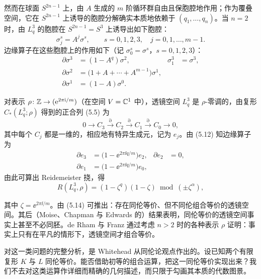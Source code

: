 然而在球面 $S^{2n-1}$ 上，由 $A$ 生成的 $m$ 阶循环群自由且保胞腔地作用；作为覆叠空间，它在 $S^{2n-1}$ 上诱导的胞腔分解确实本质地依赖于 $(q_1,\dots,q_n)$。当 $n=2$ 时，由 $L^3_q$ 的胞腔在 $S^{2n-1}=S^3$ 上诱导出如下胞腔：
\begin{equation}
  \sigma^s_j=A^j\sigma^s,\qquad s=0,1,2,3,\quad j=0,1,\dots,m-1. \tag{5.11}
\end{equation}
边缘算子在这些胞腔上的作用如下（记 $\sigma^s_0=\sigma^s$，$s=0,1,2,3$）：
\begin{equation}
\begin{aligned}
  \partial\sigma^3&=(1-A^q)\sigma^2, & \sigma^3_1&=\sigma^3,\\
  \partial\sigma^2&=\bigl(1+A+\cdots+A^{m-1}\bigr)\sigma^1,\\
  \partial\sigma^1&=(1-A)\sigma^0.
\end{aligned}\tag{5.12}
\end{equation}

对表示 $\rho\colon\mathbb{Z}\to(\mathrm{e}^{2\pi\mathrm{i}/m})$（在空间 $V=\mathbb{C}^1$ 中），透镜空间 $L^3_q$ 是 $\rho$-零调的，由复形 $C_*(L^3_q;\rho)$ 得到的正合列 (5.5) 为
\[
  0\longrightarrow C_3\xrightarrow{\partial}C_2\xrightarrow{\partial}C_1\xrightarrow{\partial}C_0\longrightarrow 0,
\]
其中每个 $C_j$ 都是一维的，相应地有特异生成元，记为 $e_j$。由 (5.12) 知边缘算子为
\begin{equation}
\begin{aligned}
  \partial e_3&=\bigl(1-\ee^{2\pi\ii q/m}\bigr)e_2, & \partial e_2&=0,\\
  \partial e_1&=\bigl(1-\ee^{2\pi\ii q/m}\bigr)e_0,
\end{aligned}\tag{5.13}
\end{equation}
由此可算出 Reidemeister 挠，得
\begin{equation}
  R(L^3_q,\rho)=(1-\zeta^q)(1-\zeta)\ \operatorname{mod}\ (\pm\zeta^\alpha), \tag{5.14}
\end{equation}

其中 $\zeta=\ee^{2\pi\ii/m}$。由 (5.14) 可推出：存在同伦等价、但不同伦组合等价的透镜空间。其后（Moise、Chapman 与 Edwards 的）结果表明，同伦等价的透镜空间事实上甚至不必同胚。de Rham 与 Franz 通过考虑 $n>2$ 时的各种表示 $\rho$ 证明：事实上只有在平凡的情形下，透镜空间才组合等价。

对这一类问题的完整分析，是 Whitehead 从同伦论观点作出的。设已知两个有限复形 $K$ 与 $L$ 同伦等价。能否借助初等的组合运算，把这一同伦等价实现出来？我们不去对这类运算作详细而精确的几何描述，而只限于勾画其本质的代数图景。


